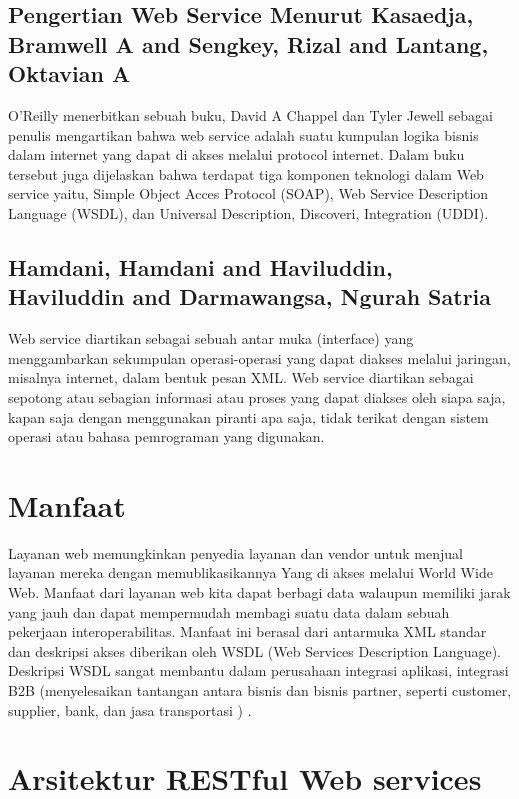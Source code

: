 \documentclass[12pt]{article}
\begin{document}
\subsection{Pengertian Web Service Menurut Kasaedja, Bramwell A and Sengkey, Rizal and Lantang, Oktavian A}

O’Reilly menerbitkan sebuah buku, David A Chappel dan Tyler Jewell sebagai penulis mengartikan bahwa web service adalah suatu kumpulan logika bisnis dalam internet yang dapat di akses melalui protocol internet. Dalam buku tersebut juga dijelaskan bahwa terdapat tiga komponen teknologi dalam Web service yaitu, Simple Object Acces Protocol (SOAP), Web Service Description Language (WSDL), dan Universal Description, Discoveri, Integration (UDDI)\cite{kasaedja2014rancang}.

\subsection{Hamdani, Hamdani and Haviluddin, Haviluddin and Darmawangsa, Ngurah Satria}

Web service diartikan sebagai sebuah antar muka (interface) yang menggambarkan sekumpulan operasi-operasi yang dapat diakses melalui jaringan, misalnya internet, dalam bentuk pesan XML. Web service diartikan sebagai sepotong atau sebagian informasi atau proses yang dapat diakses oleh siapa saja, kapan saja dengan menggunakan piranti apa saja, tidak terikat dengan sistem operasi atau bahasa pemrograman yang digunakan.



\section{Manfaat}

Layanan web memungkinkan penyedia layanan dan vendor untuk menjual layanan mereka dengan memublikasikannya
Yang di akses melalui World Wide Web.
Manfaat dari layanan web kita dapat berbagi data walaupun memiliki jarak yang jauh dan dapat mempermudah membagi suatu data dalam sebuah pekerjaan
interoperabilitas. Manfaat ini berasal dari antarmuka XML standar dan deskripsi akses
diberikan oleh WSDL (Web Services Description Language). Deskripsi WSDL sangat membantu dalam perusahaan
integrasi aplikasi, integrasi B2B (menyelesaikan tantangan antara bisnis dan bisnis partner, seperti customer, supplier, bank, dan jasa transportasi ) \cite{ferris2003web}.

\section{Arsitektur RESTful Web services}
\end{document}

